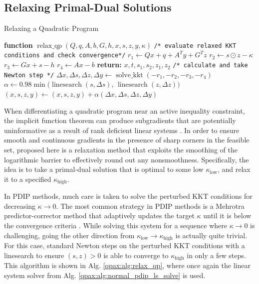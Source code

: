 \subsection{Relaxing Primal-Dual Solutions}
\begin{algorithm}
\caption{Relaxing a Quadratic Program}\label{qpax:alg:relax_qp}
\begin{algorithmic}[1]
\State \textbf{function} $\operatorname{relax\_qp}(Q,q,A, b, G,h, x, s, z, y, \kappa)$ %
\State \texttt{/* evaluate relaxed KKT conditions and check convergence*/}
\State $r_1 \gets Qx + q  + A^Ty + G^Tz$ %
\State $r_2 \gets s \odot z - \kappa$ 
\State $r_3 \gets Gx + s - h$
\State $r_4 \gets Ax - b$
\State \textbf{return:} $x, t, s_1, s_2, z_1, z_2$
\EndIf
\State
\State \texttt{/* calculate and take Newton step */}
\State $\Delta x, \Delta s, \Delta z, \Delta y \gets \operatorname{solve\_kkt}(-r_1, -r_2, -r_3, -r_4)$ 
\State $\alpha \gets 0.98 \min\big(\operatorname{linesearch}(s, \Delta s),\, \operatorname{linesearch}(z, \Delta z)\big)$ \Comment{\eqref{qpax:sec:background:linesearch}}
\State $(x, s, z, y) \gets (x, s, z, y) + \alpha(\Delta x, \Delta s, \Delta z, \Delta y)$
\EndFor
\end{algorithmic}
\end{algorithm}
When differentiating a quadratic program near an active inequality constraint, the implicit function theorem can produce subgradients that are potentially uninformative as a result of rank deficient linear systems \cite{agrawal2019a}. In order to ensure smooth and continuous gradients in the presence of sharp corners in the feasible set, proposed here is a relaxation method that exploits the smoothing of the logarithmic barrier to effectively round out any nonsmoothness. Specifically, the idea is to take a primal-dual solution that is optimal to some low $\kappa_\text{low}$, and relax it to a specified $\kappa_\text{high}$.

In PDIP methods, much care is taken to solve the perturbed KKT conditions for decreasing $\kappa \rightarrow 0$. The most common strategy in PDIP methods is a Mehrotra predictor-corrector method that adaptively updates the target $\kappa$ until it is below the convergence criteria \cite{mehrotra1992}. While solving this system for a sequence where $\kappa \rightarrow 0$ is challenging, going the other direction from $\kappa_\text{low} \rightarrow \kappa_\text{high}$ is actually quite trivial. For this case, standard Newton steps on the perturbed KKT conditions with a linesearch to ensure $(s,z) > 0$ is able to converge to $\kappa_\text{high}$ in only a few steps. This algorithm is shown in Alg. \eqref{qpax:alg:relax_qp}, where once again the linear system solver from Alg. \eqref{qpax:alg:normal_pdip_ls_solve} is used.

